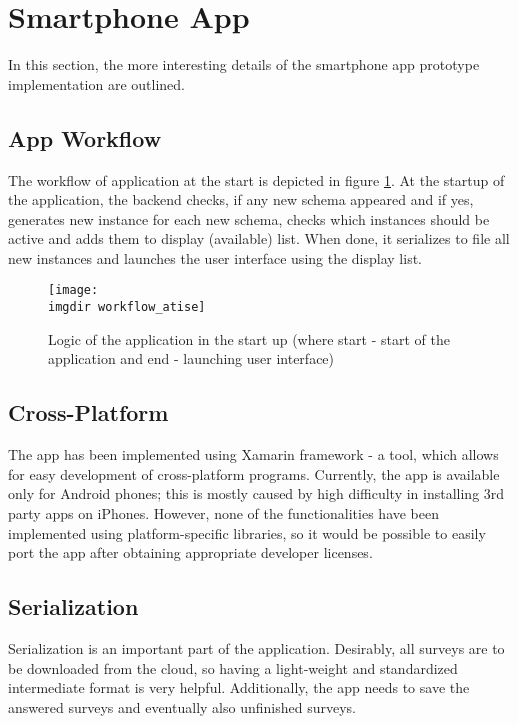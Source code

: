 \section{Smartphone App}
\label{sec:app}
In this section, the more interesting details of the smartphone app prototype implementation are outlined.

\subsection{App Workflow}
\label{subsec:workflow}
The workflow of application at the start is depicted in figure \ref{fig:startup-workflow}. At the startup of the application, the backend checks, if any new schema appeared and if yes, generates new instance for each new schema, checks which instances should be active and adds them to display (available) list. When done, it serializes to file all new instances and launches the user interface using the display list. 

\begin{figure}[!htbp]
  \centering
    \centering
    \texttt{[image: \\imgdir workflow\_atise]}
    \caption{Logic of the application in the start up (where start - start of the application and end - launching user interface)}
    \label{fig:startup-workflow}
\end{figure}

\subsection{Cross-Platform}
\label{subsec:crossplatform}
The app has been implemented using Xamarin framework - a tool, which allows for easy development of cross-platform programs. Currently, the app is available only for Android phones; this is mostly caused by high difficulty in installing 3rd party apps on iPhones. However, none of the functionalities have been implemented using platform-specific libraries, so it would be possible to easily port the app after obtaining appropriate developer licenses. 

\subsection{Serialization}
\label{subsec:serialization}
Serialization is an important part of the application. Desirably, all surveys are to be downloaded from the cloud, so having a light-weight and standardized intermediate format is very helpful. Additionally, the app needs to save the answered surveys and eventually also unfinished surveys.

